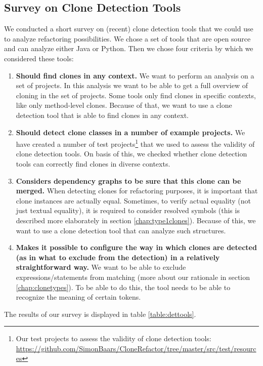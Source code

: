 \documentclass[a4paper]{article}
\begin{document}
\subsection{Survey on Clone Detection Tools}
We conducted a short survey on (recent) clone detection tools that we could use to analyze refactoring possibilities. We chose a set of tools that are open source and can analyze either Java or Python. Then we chose four criteria by which we considered these tools: 
\begin{enumerate}
    \item \textbf{Should find clones in any context.} We want to perform an analysis on a set of projects. In this analysis we want to be able to get a full overview of cloning in the set of projects. Some tools only find clones in specific contexts, like only method-level clones. Because of that, we want to use a clone detection tool that is able to find clones in any context.
\item \textbf{Should detect clone classes in a number of example projects.} We have created a number of test projects\footnote{Our test projects to assess the validity of clone detection tools: \url{https://github.com/SimonBaars/CloneRefactor/tree/master/src/test/resources}} that we used to assess the validity of clone detection tools. On basis of this, we checked whether clone detection tools can correctly find clones in diverse contexts.
\item \textbf{Considers dependency graphs to be sure that this clone can be merged.} When detecting clones for refactoring purposes, it is important that clone instances are actually equal. Sometimes, to verify actual equality (not just textual equality), it is required to consider resolved symbols (this is described more elaborately in section \ref{chap:type1clones}). Because of this, we want to use a clone detection tool that can analyze such structures.
\item \textbf{Makes it possible to configure the way in which clones are detected (as in what to exclude from the detection) in a relatively straightforward way.} We want to be able to exclude expressions/statements from matching (more about our rationale in section \ref{chap:clonetypes}). To be able to do this, the tool needs to be able to recognize the meaning of certain tokens.
\end{enumerate}

The results of our survey is displayed in table \ref{table:dettools}.
\end{document}
